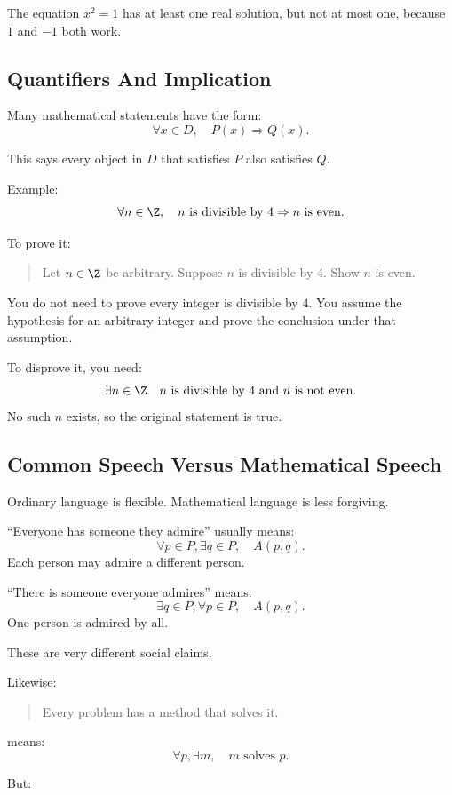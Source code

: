 The equation $x^2=1$ has at least one real solution, but not at most one, because $1$ and $-1$ both work.

\subsection{Quantifiers And Implication}

Many mathematical statements have the form:
\[
\forall x\in D,\quad P(x)\Rightarrow Q(x).
\]

This says every object in $D$ that satisfies $P$ also satisfies $Q$.

Example:
\[
\forall n\in\Z,\quad n\text{ is divisible by }4\Rightarrow n\text{ is even}.
\]

To prove it:

\begin{quote}
Let $n\in\Z$ be arbitrary. Suppose $n$ is divisible by $4$. Show $n$ is even.
\end{quote}

You do not need to prove every integer is divisible by $4$. You assume the hypothesis for an arbitrary integer and prove the conclusion under that assumption.

To disprove it, you need:
\[
\exists n\in\Z\quad n\text{ is divisible by }4\text{ and }n\text{ is not even}.
\]
No such $n$ exists, so the original statement is true.

\subsection{Common Speech Versus Mathematical Speech}

Ordinary language is flexible. Mathematical language is less forgiving.

``Everyone has someone they admire'' usually means:
\[
\forall p\in P,\exists q\in P,\quad A(p,q).
\]
Each person may admire a different person.

``There is someone everyone admires'' means:
\[
\exists q\in P,\forall p\in P,\quad A(p,q).
\]
One person is admired by all.

These are very different social claims.

Likewise:

\begin{quote}
Every problem has a method that solves it.
\end{quote}

means:
\[
\forall p,\exists m,\quad m\text{ solves }p.
\]

But:

